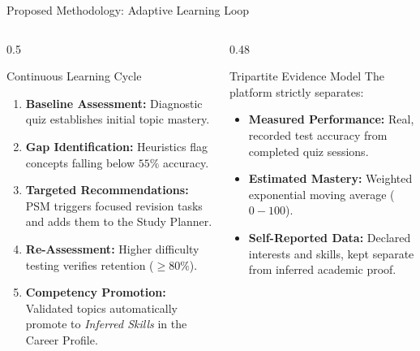 \documentclass[aspectratio=169,10pt]{beamer}
\begin{document}
\begin{frame}{Proposed Methodology: Adaptive Learning Loop}
  \begin{columns}[T]
    \begin{column}{0.5\textwidth}
      \begin{block}{Continuous Learning Cycle}
        \begin{enumerate}
          \item \textbf{Baseline Assessment:} Diagnostic quiz establishes initial topic mastery.
          \item \textbf{Gap Identification:} Heuristics flag concepts falling below $55\%$ accuracy.
          \item \textbf{Targeted Recommendations:} PSM triggers focused revision tasks and adds them to the Study Planner.
          \item \textbf{Re-Assessment:} Higher difficulty testing verifies retention ($\ge 80\%$).
          \item \textbf{Competency Promotion:} Validated topics automatically promote to \textit{Inferred Skills} in the Career Profile.
        \end{enumerate}
      \end{block}
    \end{column}
    \begin{column}{0.48\textwidth}
      \begin{exampleblock}{Tripartite Evidence Model}
        The platform strictly separates:
        \begin{itemize}
          \item \textbf{Measured Performance:} Real, recorded test accuracy from completed quiz sessions.
          \item \textbf{Estimated Mastery:} Weighted exponential moving average ($0-100$).
          \item \textbf{Self-Reported Data:} Declared interests and skills, kept separate from inferred academic proof.
        \end{itemize}
      \end{exampleblock}
    \end{column}
  \end{columns}
\end{frame}
\end{document}
